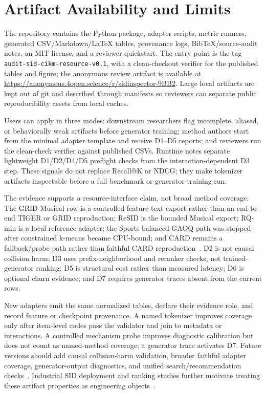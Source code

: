 \section{Artifact Availability and Limits}

The repository contains the \tool Python package, adapter scripts, metric
runners, generated CSV/Markdown/\LaTeX{} tables, provenance logs,
BibTeX/source-audit notes, an MIT license, and a reviewer quickstart. The entry
point is the tag
\texttt{audit-sid-cikm-\allowbreak resource-v0.1}, with a clean-checkout verifier for the
published tables and figure; the anonymous review artifact is available at
\url{https://anonymous.4open.science/r/sidinspector-9BB2}. Large local artifacts are kept out of git and
described through manifests so reviewers can separate public reproducibility
assets from local caches.

Users can apply \tool in three modes: downstream researchers flag incomplete,
aliased, or behaviorally weak artifacts before generator training; method
authors start from the minimal adapter template and receive D1--D5 reports; and
reviewers run the clean-check verifier against published CSVs. Runtime notes
separate lightweight D1/D2/D4/D5 preflight checks from the interaction-dependent
D3 step. These signals do not replace Recall@K or NDCG; they make tokenizer
artifacts inspectable before a full benchmark or generator-training run.

The evidence supports a resource-interface claim, not broad method coverage.
The GRID Musical row is a controlled feature-text export rather than an
end-to-end TIGER or GRID reproduction; ReSID is the bounded Musical export;
RQ-min is a local reference adapter; the Sports balanced GAOQ path was stopped
after constrained k-means became CPU-bound; and CARD remains a fallback/probe
path rather than faithful CARD reproduction~\cite{wei2026card}. D2 is not
causal collision harm; D3 uses prefix-neighborhood and reranker checks, not
trained-generator ranking; D5 is structural cost rather than measured latency;
D6 is optional churn evidence; and D7 requires generator traces absent from the
current rows.

New adapters emit the same normalized tables, declare their evidence role, and
record feature or checkpoint provenance. A named tokenizer improves coverage
only after item-level codes pass the validator and join to metadata or
interactions. A controlled mechanism probe improves diagnostic calibration but
does not count as named-method coverage; a generator trace activates D7.
Future versions should add causal collision-harm validation, broader faithful
adapter coverage, generator-output diagnostics, and unified search/recommendation
checks~\cite{li2024survey,penha2025jointsid}. Industrial SID deployment and
ranking studies further motivate treating these artifact properties as
engineering objects~\cite{singh2023bettersemanticids,li2026sidcoord,ju2026snapchatsid,xu2026largescalegenrec}.
